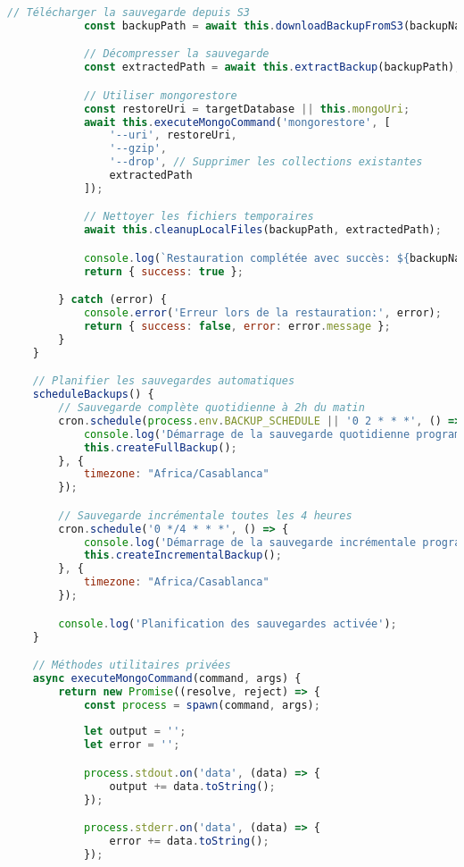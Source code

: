 \begin{lstlisting}[language=JavaScript, caption=backup-script.js]
            // Télécharger la sauvegarde depuis S3
            const backupPath = await this.downloadBackupFromS3(backupName);

            // Décompresser la sauvegarde
            const extractedPath = await this.extractBackup(backupPath);

            // Utiliser mongorestore
            const restoreUri = targetDatabase || this.mongoUri;
            await this.executeMongoCommand('mongorestore', [
                '--uri', restoreUri,
                '--gzip',
                '--drop', // Supprimer les collections existantes
                extractedPath
            ]);

            // Nettoyer les fichiers temporaires
            await this.cleanupLocalFiles(backupPath, extractedPath);

            console.log(`Restauration complétée avec succès: ${backupName}`);
            return { success: true };

        } catch (error) {
            console.error('Erreur lors de la restauration:', error);
            return { success: false, error: error.message };
        }
    }

    // Planifier les sauvegardes automatiques
    scheduleBackups() {
        // Sauvegarde complète quotidienne à 2h du matin
        cron.schedule(process.env.BACKUP_SCHEDULE || '0 2 * * *', () => {
            console.log('Démarrage de la sauvegarde quotidienne programmée');
            this.createFullBackup();
        }, {
            timezone: "Africa/Casablanca"
        });

        // Sauvegarde incrémentale toutes les 4 heures
        cron.schedule('0 */4 * * *', () => {
            console.log('Démarrage de la sauvegarde incrémentale programmée');
            this.createIncrementalBackup();
        }, {
            timezone: "Africa/Casablanca"
        });

        console.log('Planification des sauvegardes activée');
    }

    // Méthodes utilitaires privées
    async executeMongoCommand(command, args) {
        return new Promise((resolve, reject) => {
            const process = spawn(command, args);
            
            let output = '';
            let error = '';

            process.stdout.on('data', (data) => {
                output += data.toString();
            });

            process.stderr.on('data', (data) => {
                error += data.toString();
            });


\end{lstlisting}
